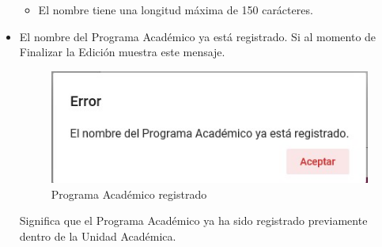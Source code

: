 \begin{itemize}
\begin{itemize}
                        \item El nombre tiene una longitud máxima de 150 carácteres.
                    \end{itemize}

                \item El nombre del Programa Académico ya está registrado.
                    Si al momento de Finalizar la Edición muestra este mensaje.

                     \begin{figure}[H]
                    \centering
                    \hypertarget{vacio}{\includegraphics[width=0.7\linewidth]{images/SP3/Yareg}}
                    \caption{Programa Académico registrado}
                    \label{vacio}
                    \end{figure}

                    Significa que el Programa Académico ya ha sido registrado previamente dentro de la Unidad Académica.
            \end{itemize}
